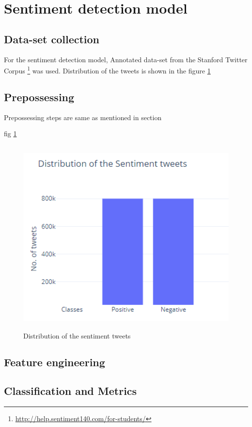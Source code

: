 \section{Sentiment detection model}
\subsection{Data-set collection}
For the sentiment detection model, Annotated data-set from the Stanford Twitter Corpus \footnote{\url{http://help.sentiment140.com/for-students/}} was used. Distribution of the tweets is shown in the figure \ref{fig:graphDistsentiment}

\subsection{Prepossessing}
Prepossessing steps are same as mentioned in section 

fig \ref{fig:graphDistsentiment}
\begin{figure}
	\centering
	\includegraphics[width=12cm\linewidth,height=10cm]{thesis_template/images/distofsentiment_tweetsundefined.png}
	\caption{Distribution of the sentiment tweets}
	\label{fig:graphDistsentiment}
\end{figure}


\subsection{Feature engineering }
\subsection{Classification and Metrics}

